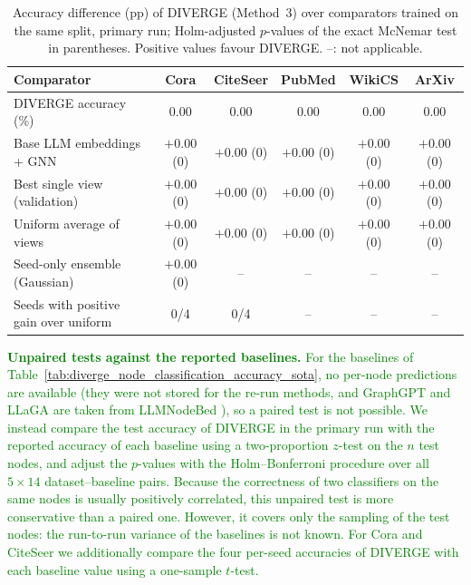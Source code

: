 \documentclass[a4paper,fleqn]{cas-sc}
\newcommand{\revthree}[1]{\textcolor{green}{#1}} %
\begin{document}
\begin{table}[htbp]
\centering\color{green}
\caption{Accuracy difference (pp) of DIVERGE (Method~3) over comparators trained on the same split, primary run; Holm-adjusted $p$-values of the exact McNemar test in parentheses. Positive values favour DIVERGE. --: not applicable.}
\label{tab:significance_inhouse}
\small
\setlength{\tabcolsep}{3pt}
\begin{tabular*}{\textwidth}{@{\extracolsep{\fill}} lccccc @{}}
\toprule
\textbf{Comparator} & \textbf{Cora} & \textbf{CiteSeer} & \textbf{PubMed} & \textbf{WikiCS} & \textbf{ArXiv} \\
\midrule
DIVERGE accuracy (\%)          & 0.00 & 0.00 & 0.00 & 0.00 & 0.00 \\
\midrule
Base LLM embeddings + GNN      & $+0.00$ (0) & $+0.00$ (0) & $+0.00$ (0) & $+0.00$ (0) & $+0.00$ (0) \\
Best single view (validation)  & $+0.00$ (0) & $+0.00$ (0) & $+0.00$ (0) & $+0.00$ (0) & $+0.00$ (0) \\
Uniform average of views       & $+0.00$ (0) & $+0.00$ (0) & $+0.00$ (0) & $+0.00$ (0) & $+0.00$ (0) \\
Seed-only ensemble (Gaussian)  & $+0.00$ (0) & -- & -- & -- & -- \\
\midrule
Seeds with positive gain over uniform & 0/4 & 0/4 & -- & -- & -- \\
\bottomrule
\end{tabular*}
\end{table}

\revthree{\textbf{Unpaired tests against the reported baselines.} For the baselines of Table~\ref{tab:diverge_node_classification_accuracy_sota}, no per-node predictions are available (they were not stored for the re-run methods, and GraphGPT and LLaGA are taken from LLMNodeBed \citep{Wu2025LLMNode}), so a paired test is not possible. We instead compare the test accuracy of DIVERGE in the primary run with the reported accuracy of each baseline using a two-proportion $z$-test on the $n$ test nodes, and adjust the $p$-values with the Holm--Bonferroni procedure over all $5\times14$ dataset--baseline pairs. Because the correctness of two classifiers on the same nodes is usually positively correlated, this unpaired test is more conservative than a paired one. However, it covers only the sampling of the test nodes: the run-to-run variance of the baselines is not known. For Cora and CiteSeer we additionally compare the four per-seed accuracies of DIVERGE with each baseline value using a one-sample $t$-test.}
\end{document}
